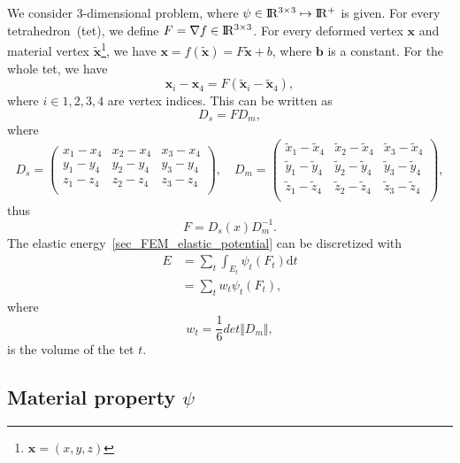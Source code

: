 \documentclass{fancydoc}
\newcommand{\diffd}{\mathrm{d}}
\newcommand{\realR}{\rm I\!R}
\begin{document}
We consider 3-dimensional problem, where $\psi \in \realR^{3\times 3} \mapsto \realR^+$ is given. For every tetrahedron~(tet), we define $F = \nabla f \in \realR^{3 \times 3}$. For every deformed vertex $\mathbf{x}$ and material vertex $\tilde{\mathbf{x}}$\footnote{$\mathbf{x} = (x, y, z)$}, we have $\mathbf{x} = f(\tilde{\mathbf{x}}) = F\tilde{\mathbf{x}} + b$, where $\mathbf{b}$ is a constant. For the whole tet, we have
\begin{equation}
\mathbf{x}_i - \mathbf{x}_4 = F(\tilde{\mathbf{x}}_i - \tilde{\mathbf{x}}_4),
\end{equation}
where $i \in {1,2,3,4}$ are vertex indices. This can be written as
\begin{equation}
D_s = F D_m,
\end{equation}
where 
\begin{equation}
D_s = \begin{pmatrix}
x_1 - x_4 & x_2 - x_4 & x_3 - x_4 \\
y_1 - y_4 & y_2 - y_4 & y_3 - y_4 \\
z_1 - z_4 & z_2 - z_4 & z_3 - z_4 \\
\end{pmatrix}, \quad
D_m= \begin{pmatrix}
\tilde{x}_1 - \tilde{x}_4 & \tilde{x}_2 - \tilde{x}_4 & \tilde{x}_3 - \tilde{x}_4 \\
\tilde{y}_1 - \tilde{y}_4 & \tilde{y}_2 - \tilde{y}_4 & \tilde{y}_3 - \tilde{y}_4 \\
\tilde{z}_1 - \tilde{z}_4 & \tilde{z}_2 - \tilde{z}_4 & \tilde{z}_3 - \tilde{z}_4 \\
\end{pmatrix},
\end{equation}
thus
\begin{equation}
F = D_s(x)D_m^{-1}.
\end{equation}
The elastic energy~\eqref{sec_FEM_elastic_potential} can be discretized with
\begin{subequations}
\begin{align}
E &= \sum_t \int_{E_t} \psi_t(F_t) \diffd t\\
  &= \sum_t w_t\psi_t(F_t),
\end{align}
\end{subequations}
where
\begin{equation}
w_t = \frac{1}{6} det\Vert D_m\Vert,
\end{equation}
is the volume of the tet $t$.

\subsection{Material property $\psi$}
\end{document}
